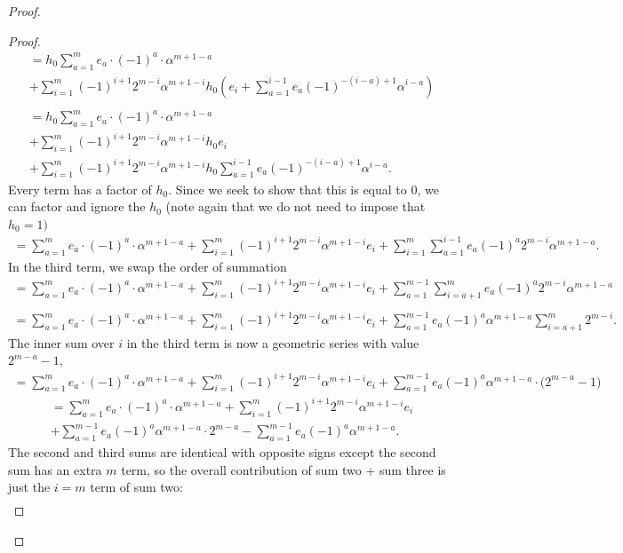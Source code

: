 \documentclass[10pt,a4paper]{amsart}
\begin{document}
\begin{proof}
\begin{proof}
\begin{gather*}
=h_0 \sum_{a=1}^me_a\cdot(-1)^a\cdot \alpha^{m+1-a}\\
+\sum_{i=1}^m(-1)^{i+1}2^{m-i}\alpha^{m+1-i}h_0\left(e_i+\sum_{a=1}^{i-1}e_a(-1)^{-(i-a)+1}\alpha^{i-a}\right)\\\\
=h_0 \sum_{a=1}^me_a\cdot(-1)^a\cdot \alpha^{m+1-a}\\
+\sum_{i=1}^m(-1)^{i+1}2^{m-i}\alpha^{m+1-i}h_0e_i\\
+\sum_{i=1}^m(-1)^{i+1}2^{m-i}\alpha^{m+1-i}h_0\sum_{a=1}^{i-1}e_a(-1)^{-(i-a)+1}\alpha^{i-a}.
\end{gather*}
Every term has a factor of $h_0$. Since we seek to show that this is equal to 0, we can factor and ignore the $h_0$ (note again that we do not need to impose that $h_0=1)$
\begin{gather*}
=\sum_{a=1}^me_a\cdot(-1)^a\cdot \alpha^{m+1-a}+\sum_{i=1}^m(-1)^{i+1}2^{m-i}\alpha^{m+1-i}e_i+\sum_{i=1}^m\sum_{a=1}^{i-1}e_a(-1)^a2^{m-i}\alpha^{m+1-a}.
\end{gather*}
In the third term, we swap the order of summation
\begin{gather*}
= \sum_{a=1}^me_a\cdot(-1)^a\cdot \alpha^{m+1-a}+\sum_{i=1}^m(-1)^{i+1}2^{m-i}\alpha^{m+1-i}e_i+\sum_{a=1}^{m-1}\sum_{i=a+1}^{m}e_a(-1)^a2^{m-i}\alpha^{m+1-a}\\\\
=\sum_{a=1}^me_a\cdot(-1)^a\cdot \alpha^{m+1-a} +\sum_{i=1}^m(-1)^{i+1}2^{m-i}\alpha^{m+1-i}e_i +\sum_{a=1}^{m-1}e_a(-1)^a \alpha^{m+1-a}\sum_{i=a+1}^{m}2^{m-i}.
\end{gather*}
The inner sum over $i$ in the third term is now a geometric series with value $2^{m-a}-1$,
\begin{gather*}
= \sum_{a=1}^me_a\cdot(-1)^a\cdot \alpha^{m+1-a}+\sum_{i=1}^m(-1)^{i+1}2^{m-i}\alpha^{m+1-i}e_i+\sum_{a=1}^{m-1}e_a(-1)^a \alpha^{m+1-a}\cdot\big(2^{m-a}-1\big)
\end{gather*}
\begin{gather*}
= \sum_{a=1}^me_a\cdot(-1)^a\cdot \alpha^{m+1-a}+\sum_{i=1}^m(-1)^{i+1}2^{m-i}\alpha^{m+1-i}e_i\\
+\sum_{a=1}^{m-1}e_a(-1)^a \alpha^{m+1-a}\cdot 2^{m-a}-\sum_{a=1}^{m-1}e_a(-1)^a \alpha^{m+1-a}.
\end{gather*}
The second and third sums are identical with opposite signs except the second sum has an extra $m$ term, so the overall contribution of sum two + sum three is just the $i=m$ term of sum two:
\begin{gather*}

\end{gather*}
\end{proof}
\end{proof}
\end{document}
